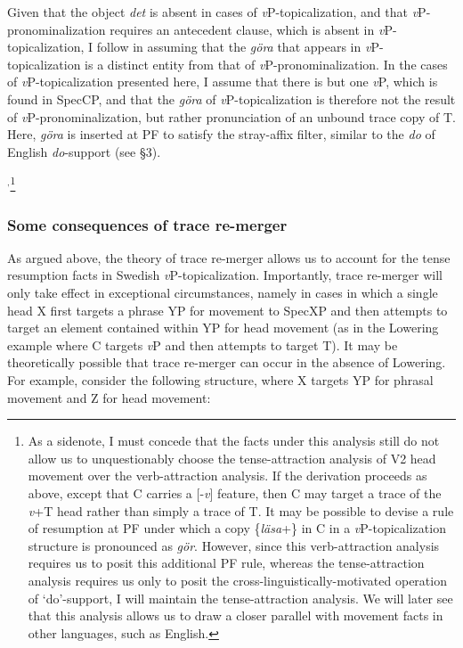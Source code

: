 {\begin{quote}
\end{quote}
Given that the object \textit{det} is absent in cases of \textit{v}P-topicalization, and that {\it v}P-pronominalization requires an antecedent clause, which is absent in {\it v}P-topicalization, I follow \citet{kallgren_prince1989} in assuming that the \textit{g\"{o}ra} that appears in \textit{v}P-topicalization is a distinct entity from that of \textit{v}P-pronominalization. In the cases of \textit{v}P-topicalization presented here, I assume that there is but one \textit{v}P, which is found in SpecCP, and that the \textit{g\"{o}ra} of \textit{v}P-topicalization is therefore not the result of \textit{v}P-pronominalization, but rather pronunciation of an unbound trace copy of T. Here, \textit{g\"{o}ra} is inserted at PF to satisfy the stray-affix filter, similar to the \textit{do} of English \textit{do}-support (see \S3).
}$^{,}$\footnote{As a sidenote, I must concede that the facts under this analysis still do not allow us to unquestionably choose the tense-attraction analysis of V2 head movement over the verb-attraction analysis. If the derivation proceeds as above, except that C carries a [-{\it v}] feature, then C may target a trace of the {\it v}+T head rather than simply a trace of T. It may be possible to devise a rule of resumption at PF under which a copy \{{\it l\"{a}sa}+\mbox{}\} in C in a {\it v}P-topicalization structure is pronounced as {\it g\"{o}r}. However, since this verb-attraction analysis requires us to posit this additional PF rule, whereas the tense-attraction analysis requires us only to posit the cross-linguistically-motivated operation of `do'-support, I will maintain the tense-attraction analysis. We will later see that this analysis allows us to draw a closer parallel with movement facts in other languages, such as English.}\\


\subsubsection{Some consequences of trace re-merger}

\noindent
As argued above, the theory of trace re-merger allows us to account for the tense resumption facts in Swedish {\it v}P-topicalization. Importantly, trace re-merger will only take effect in exceptional circumstances, namely in cases in which a single head X first targets a phrase YP for movement to SpecXP and then attempts to target an element contained within YP for head movement (as in the Lowering example where C targets {\it v}P and then attempts to target T). It may be theoretically possible that trace re-merger can occur in the absence of Lowering. For example, consider the following structure, where X targets YP for phrasal movement and Z for head movement:


